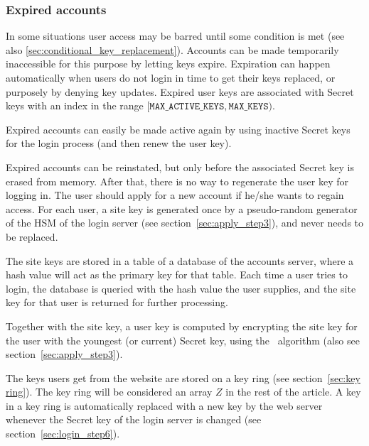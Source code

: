 \subsubsection{Expired accounts}
In some situations user access may be barred until some condition is met
(see also \vref{sec:conditional_key_replacement}).
Accounts can be made temporarily inaccessible for this purpose by letting keys expire.
Expiration can happen automatically when users do not login in time to get their keys replaced,
or purposely by denying key updates.
Expired user keys are associated with Secret keys with an index in the range $[\texttt{MAX\_ACTIVE\_KEYS},\texttt{MAX\_KEYS})$.
\par
Expired accounts can easily be made active again by using inactive Secret keys for the login process
(and then renew the user key).
\par
Expired accounts can be reinstated,
but only before the associated Secret key is erased from memory.
After that, there is no way to regenerate the user key for logging in.
The user should apply for a new account if he/she wants to regain access.
For each user,
a site key is generated once by a pseudo-random generator of the HSM of the login server
(see section~\vref{sec:apply_step3}),
and never needs to be replaced.
\par
The site keys are stored in a table of a database of the accounts server,
where a hash value will act as the primary key for that table.
Each time a user tries to login,
the database is queried with the hash value the user supplies,
and the site key for that user is returned for further processing.

\label{sec:userkeys}
Together with the site key,
a user key is computed by encrypting the site key for the user with the youngest
(or current)
Secret key,
using the \AES\ algorithm
(also see section~\vref{sec:apply_step3}).
\par
The keys users get from the website are stored on a key ring (see section~\vref{sec:key ring}).
The key ring will be considered an array $Z$ in the rest of the article.
A key in a key ring is automatically replaced with a new key by the web server
whenever the Secret key of the login server is changed
(see section~\vref{sec:login_step6}).


